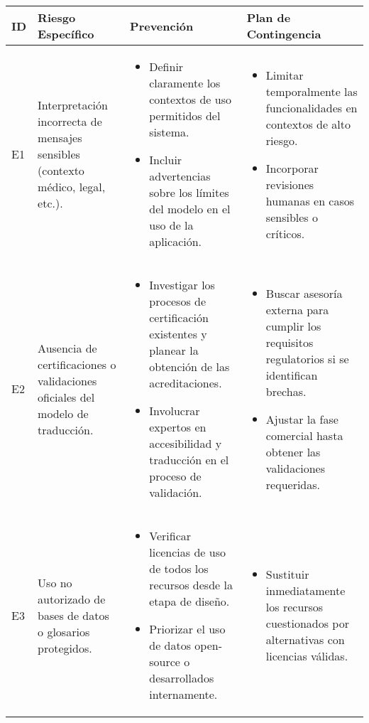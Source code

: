 \begin{longtable}{|>{\centering\arraybackslash}p{0.7cm}|>{\raggedright\arraybackslash}p{4cm}|>{\raggedright\arraybackslash}p{5.5cm}|>{\raggedright\arraybackslash}p{5.5cm}|}
	\hline
	\textbf{ID} & \textbf{Riesgo Específico} & \textbf{Prevención} & \textbf{Plan de Contingencia} \\
	\hline
	E1 & Interpretación incorrecta de mensajes sensibles (contexto médico, legal, etc.). &
	\begin{itemize}
		\item Definir claramente los contextos de uso permitidos del sistema.
		\item Incluir advertencias sobre los límites del modelo en el uso de la aplicación.
	\end{itemize} &
	\begin{itemize}
		\item Limitar temporalmente las funcionalidades en contextos de alto riesgo.
		\item Incorporar revisiones humanas en casos sensibles o críticos.
	\end{itemize} \\
	\hline
	E2 & Ausencia de certificaciones o validaciones oficiales del modelo de traducción. &
	\begin{itemize}
		\item Investigar los procesos de certificación existentes y planear la obtención de las acreditaciones.
		\item Involucrar expertos en accesibilidad y traducción en el proceso de validación.
	\end{itemize} &
	\begin{itemize}
		\item Buscar asesoría externa para cumplir los requisitos regulatorios si se identifican brechas.
		\item Ajustar la fase comercial hasta obtener las validaciones requeridas.
	\end{itemize} \\
	\hline
	E3 & Uso no autorizado de bases de datos o glosarios protegidos. &
	\begin{itemize}
		\item Verificar licencias de uso de todos los recursos desde la etapa de diseño.
		\item Priorizar el uso de datos open-source o desarrollados internamente.
	\end{itemize} &
	\begin{itemize}
		\item Sustituir inmediatamente los recursos cuestionados por alternativas con licencias válidas.

\end{itemize}
\end{longtable}
